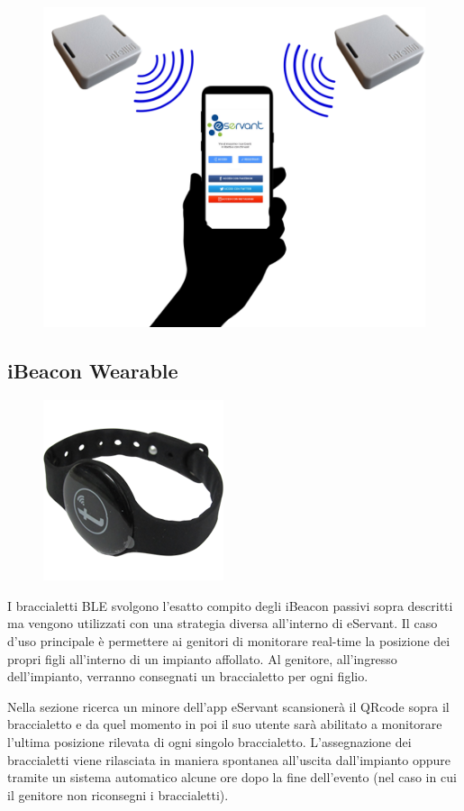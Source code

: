 \begin{figure}[H]
    \centering  
    \includegraphics[scale=0.4]{img/cap4/ibeacon-advertising}
\end{figure}

\subsection{iBeacon Wearable}
\begin{figure}[H]
    \centering  
    \includegraphics[scale=0.4]{img/cap4/wearable}
\end{figure}
I braccialetti BLE svolgono l'esatto compito degli iBeacon passivi sopra descritti ma vengono utilizzati
con una strategia diversa all'interno di eServant.
Il caso d'uso principale è permettere ai genitori di monitorare real-time la posizione dei propri
figli all'interno di un impianto affollato.
Al genitore, all'ingresso dell'impianto, verranno consegnati un braccialetto per ogni figlio.

Nella sezione ricerca un minore dell'app eServant scansionerà il QRcode sopra il braccialetto e da quel momento
in poi il suo utente sarà abilitato a monitorare l'ultima posizione rilevata di ogni singolo braccialetto.
L'assegnazione dei braccialetti viene rilasciata in maniera spontanea all'uscita dall'impianto oppure 
tramite un sistema automatico alcune ore dopo la fine dell'evento (nel caso in cui il genitore non riconsegni
i braccialetti).

